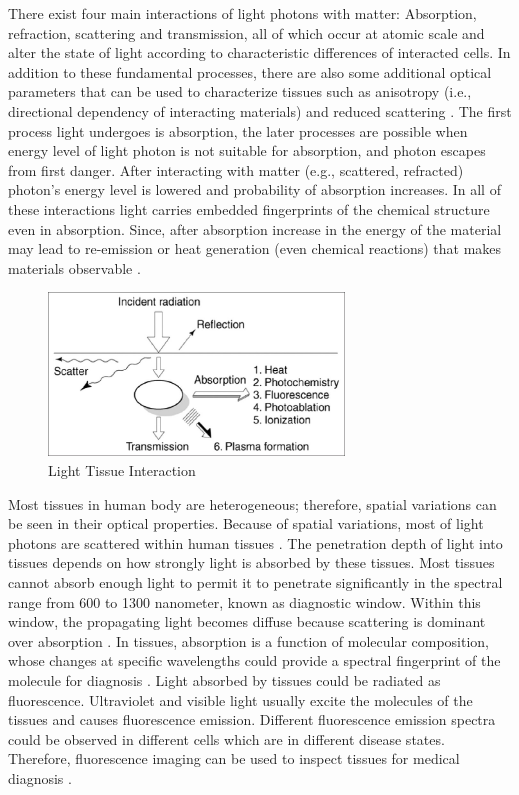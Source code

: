 \documentclass[a4paper]{article}
\begin{document}
    \medskip
     \hspace{5mm} There exist four main interactions of light photons with matter: Absorption, refraction, scattering and transmission, all of which occur at atomic scale and alter the state of light according to characteristic differences of interacted cells. In addition to these fundamental processes, there are also some additional optical parameters that can be used to characterize tissues such as anisotropy (i.e., directional dependency of interacting materials) and reduced scattering \cite{bes.1}. The first process light undergoes is absorption, the later processes are possible when energy level of light photon is not suitable for absorption, and photon escapes from first danger. After interacting with matter (e.g., scattered, refracted) photon's energy level is lowered and probability of absorption increases. In all of these interactions light carries embedded fingerprints of the chemical structure even in absorption. Since, after absorption increase in the energy of the material may lead to re-emission or heat generation (even chemical reactions) that makes materials observable \cite{bes.2}.
       \medskip
    \begin{figure}[h]
		\includegraphics[width=0.7\textwidth]{light_tissue.jpg}
			\centering
         \caption{Light Tissue Interaction \cite{onbir}}
	\end{figure}
     
    \hspace{5mm} Most tissues in human body are heterogeneous; therefore, spatial variations can be seen in their optical properties. Because of spatial variations, most of light photons are scattered within human tissues \cite{alti}. The penetration depth of light into tissues depends on how strongly light is absorbed by these tissues. Most tissues cannot absorb enough light to permit it to penetrate significantly in the spectral range from 600 to 1300 nanometer, known as diagnostic window. Within this window, the propagating light becomes diffuse because scattering is dominant over absorption \cite{alti} \cite{yedi}. In tissues, absorption is a function of molecular composition, whose changes at specific wavelengths could provide a spectral fingerprint of the molecule for diagnosis \cite{alti} \cite{sekiz}. Light absorbed by tissues could be radiated as fluorescence. Ultraviolet and visible light usually excite the molecules of the tissues and causes fluorescence emission. Different fluorescence emission spectra could be observed in different cells which are in different disease states. Therefore, fluorescence imaging can be used to inspect tissues for medical diagnosis \cite{yedi}.
\end{document}
